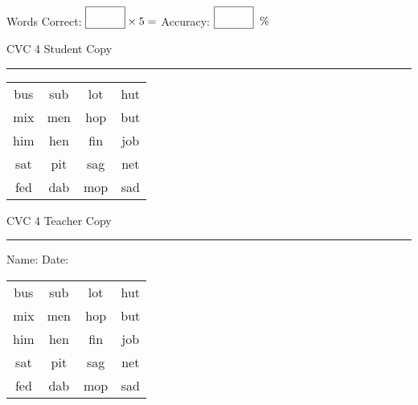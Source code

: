 \documentclass{memoir}
\begin{document}
\small

Words Correct: $\fbox{\phantom{\huge 100}} \times 5 = $ Accuracy: $\fbox{\phantom{\huge 100}}\;\; \%$ 

\vfill

\newpage


\footnotesize \noindent
CVC 4 \hfill Student Copy
\smallskip
\hrule

\Large

\setlength{\tabcolsep}{14pt}
\def\arraystretch{2}

{\selectfont


\begin{vplace}[0.5]
\begin{center}
\begin{tabular}{cccc}
bus & sub & lot & hut \\
mix & men & hop & but \\
him & hen & fin & job \\
sat & pit & sag & net \\
fed & dab & mop & sad \\
\end{tabular}
\end{center}
\end{vplace}

}

\newpage

\footnotesize \noindent
CVC 4 \hfill Teacher Copy
\smallskip
\hrule

\small

\vfill

\noindent
Name: \underline{\hspace{1.75in}} \hfill Date: \underline{\hspace{1in}}

\Large

{\selectfont


\begin{vplace}[0.5]
\begin{center}
\begin{tabular}{cccc}
bus & sub & lot & hut \\
mix & men & hop & but \\
him & hen & fin & job \\
sat & pit & sag & net \\
fed & dab & mop & sad \\
\end{tabular}
\end{center}
\end{vplace}



}
\end{document}
